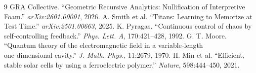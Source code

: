\documentclass[12pt,a4paper]{article}
\begin{document}
\begin{thebibliography}{9}
 GRA Collective. ``Geometric Recursive Analytics: Nullification of Interpretive Foam.'' \textit{arXiv:2601.00001}, 2026.
 A. Smith et al. ``Titans: Learning to Memorize at Test Time.'' \textit{arXiv:2501.00663}, 2025.
 K. Pyragas. ``Continuous control of chaos by self‑controlling feedback.'' \textit{Phys. Lett. A}, 170:421–428, 1992.
 G. T. Moore. ``Quantum theory of the electromagnetic field in a variable‑length one‑dimensional cavity.'' \textit{J. Math. Phys.}, 11:2679, 1970.
 H. Min et al. ``Efficient, stable solar cells by using a ferroelectric polymer.'' \textit{Nature}, 598:444–450, 2021.
\end{thebibliography}
\end{document}
